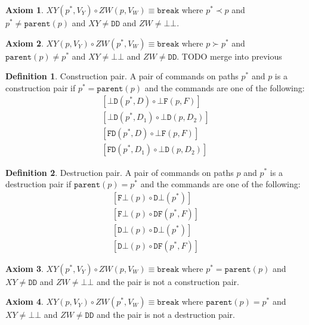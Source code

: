 \documentclass[12pt]{article}
\newcommand{\empt}{\bot}
\newcommand{\parent}{\mathtt{parent}}
\newcommand{\pp}{p^*} %
\newcommand{\cbrk}{\mathtt{break}}
\newcommand{\fscommand}[2]{{#1#2}}
\newcommand{\fsregcommandchar}[1]{\mathtt{#1}}
\newcommand{\fsregcommand}[2]{\fscommand{\fsregcommandchar{#1}}{\fsregcommandchar{#2}}}
\newcommand{\cbb}{\fsregcommand{\empt}{\empt}}
\newcommand{\cbf}{\fsregcommand{\empt}{F}}
\newcommand{\cbd}{\fsregcommand{\empt}{D}}
\newcommand{\cfb}{\fsregcommand{F}{\empt}}
\newcommand{\cfd}{\fsregcommand{F}{D}}
\newcommand{\cdb}{\fsregcommand{D}{\empt}}
\newcommand{\cdf}{\fsregcommand{D}{F}}
\newcommand{\cdd}{\fsregcommand{D}{D}}
\newcommand{\cxy}{\fscommand{X}{Y}}
\newcommand{\czw}{\fscommand{Z}{W}}
\newcommand{\cc}{\circ} %
\newcommand{\descendant}{\prec}
\newcommand{\ancestor}{\succ}
\theoremstyle{definition}
\newtheorem{mydef}{Definition}
\newtheorem{myax}{Axiom}
\begin{document}

\begin{myax}\label{ax_distantchild_breaks}
$\cxy(\pp,V_Y)\cc  \czw(p,V_W) \equiv \cbrk$ where $\pp\descendant p$ and $\pp\neq\parent(p)$ and $\cxy\neq\cdd$ and $\czw\neq\cbb$.
\end{myax}

\begin{myax}\label{ax_distantparent_breaks}
$\cxy(p,V_Y)\cc  \czw(\pp,V_W) \equiv \cbrk$ where $p\ancestor \pp$ and $\parent(p)\neq \pp$ and $\cxy\neq\cbb$ and $\czw\neq\cdd$.
TODO merge into previous
\end{myax}

\begin{mydef}{Construction pair.}
A pair of commands on paths $\pp$ and $p$ is a construction pair if $\pp=\parent(p)$ and the commands are one
of the following:
   \begin{gather*}
            [\cbd(\pp, D)\cc  \cbf(p, F)] \\
            [\cbd(\pp, D_1)\cc  \cbd(p, D_2)] \\
            [\cfd(\pp, D)\cc  \cbf(p, F)] \\
            [\cfd(\pp, D_1)\cc  \cbd(p, D_2)]
   \end{gather*}
\end{mydef}

\begin{mydef}{Destruction pair.}
A pair of commands on paths $p$ and $\pp$ is a destruction pair if $\parent(p)=\pp$ and the commands are one
of the following:
   \begin{gather*}
            [\cfb(p)\cc  \cdb(\pp)] \\
            [\cfb(p)\cc  \cdf(\pp, F)] \\
            [\cdb(p)\cc  \cdb(\pp)] \\
            [\cdb(p)\cc  \cdf(\pp, F)]
   \end{gather*}
\end{mydef}

\begin{myax}\label{ax_directchild_breaks}
$\cxy(\pp,V_Y)\cc  \czw(p,V_W) \equiv \cbrk$ where $\pp=\parent(p)$ and $\cxy\neq\cdd$ and $\czw\neq\cbb$
and the pair is not a construction pair.
\end{myax}

\begin{myax}\label{ax_directparent_breaks}
$\cxy(p,V_Y)\cc  \czw(\pp,V_W) \equiv \cbrk$ where $\parent(p)=\pp$ and $\cxy\neq\cbb$ and $\czw\neq\cdd$
and the pair is not a destruction pair.
\end{myax}
\end{document}
